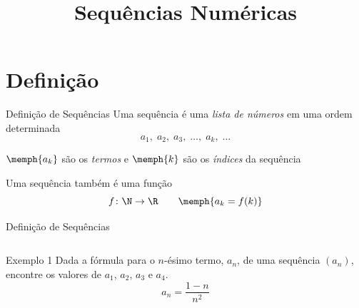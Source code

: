 
\usepackage{integracao_e_series}

\title{Sequências Numéricas}



\addtitle

\section{Definição}

\begin{frame}{Definição de Sequências}
    Uma sequência é uma \emph{lista de números} em uma ordem determinada
    \[a_1,\;a_2,\;a_3,\; \dots,\; a_k,\; \dots\]

    \pause
    $\memph{a_k}$ são os \emph{termos}
    \pause
    \;e\; $\memph{k}$ são os \emph{índices} da sequência

    \pause
    \vspace{\baselineskip}
    Uma sequência também é uma função
    \[f\colon\N\to\R \qquad \memph{a_k = f(k)}\]
\end{frame}

\begin{frame}{Definição de Sequências}
\begin{columns}
  \centerline{\scalebox{0.9}{}}  \pause
  \centerline{\scalebox{0.9}{}}
\end{columns}
\end{frame}

\begin{frame}{Exemplo 1}
Dada a fórmula para o $n$-ésimo termo, $a_n$, de uma sequência $(a_n)$,\\
encontre os valores de $a_1$, $a_2$, $a_3$ e $a_4$.
\[
  a_n = \frac{1-n}{n^2}
\]
\end{frame}

